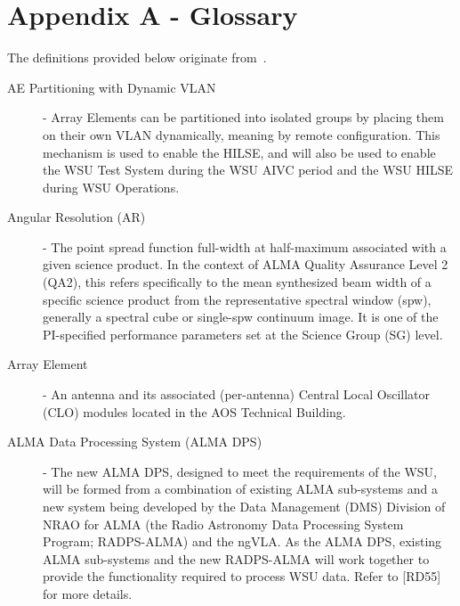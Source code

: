 \section{Appendix A - Glossary}
\label{sec:glossary}

The definitions provided below originate from~\cite{dp}.

\begin{description}
\item[AE Partitioning with Dynamic VLAN] - Array Elements can be partitioned into
isolated groups by placing them on their own VLAN dynamically, meaning by remote
configuration.  This mechanism is used to enable the HILSE, and will also be used
to enable the WSU Test System during the WSU AIVC period and the WSU HILSE during
WSU Operations.
\item[Angular Resolution (AR)] - The point spread function  full-width at half-maximum associated with a given science product. In the context of ALMA Quality Assurance Level 2 (QA2), this refers specifically to the mean synthesized beam width of a specific science product from the representative spectral window (spw), generally a spectral cube or single-spw continuum image. It is one of the PI-specified performance parameters set at the Science Group (SG) level.
\item[Array Element] - An antenna and its associated (per-antenna) Central Local Oscillator (CLO) modules located in the AOS Technical Building.

\item[ALMA Data Processing System (ALMA DPS)] - The new ALMA DPS, designed to meet the requirements of the WSU, will be formed from a combination of existing ALMA sub-systems and a new system being developed by the Data Management (DMS) Division of NRAO for ALMA (the Radio Astronomy Data Processing System Program; RADPS-ALMA) and the ngVLA. As the ALMA DPS, existing ALMA sub-systems and the new RADPS-ALMA will work together to provide the functionality required to process WSU data. Refer to [RD55] for more details. 


\end{description}
